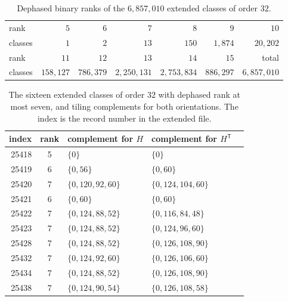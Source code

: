 \documentclass[11pt]{amsart}
\theoremstyle{definition}
\theoremstyle{remark}
\numberwithin{equation}{section}
\numberwithin{table}{section}
\newcommand{\T}{\mathsf{T}}
\begin{document}
\begin{table}[ht]
\centering
\caption{Dephased binary ranks of the $6{,}857{,}010$ extended classes of order $32$.}\label{tab:ranks}
\small
\begin{tabular}{lrrrrrr}
\toprule
rank & $5$ & $6$ & $7$ & $8$ & $9$ & $10$\\
classes & $1$ & $2$ & $13$ & $150$ & $1{,}874$ & $20{,}202$\\
\midrule
rank & $11$ & $12$ & $13$ & $14$ & $15$ & total\\
classes & $158{,}127$ & $786{,}379$ & $2{,}250{,}131$ & $2{,}753{,}834$ & $886{,}297$ & $6{,}857{,}010$\\
\bottomrule
\end{tabular}
\end{table}

\begin{table}[ht]
\centering
\caption{The sixteen extended classes of order $32$ with dephased rank at most seven, and tiling complements for both orientations. The index is the record number in the extended file.}\label{tab:witnesses}
\small
\begin{tabular}{rclll}
\toprule
index & rank & complement for $H$ & complement for $H^{\T}$\\
\midrule
25418 & 5 & $\{0\}$ & $\{0\}$ \\
25419 & 6 & $\{0,\allowbreak 56\}$ & $\{0,\allowbreak 60\}$ \\
25420 & 7 & $\{0,\allowbreak 120,\allowbreak 92,\allowbreak 60\}$ & $\{0,\allowbreak 124,\allowbreak 104,\allowbreak 60\}$ \\
25421 & 6 & $\{0,\allowbreak 60\}$ & $\{0,\allowbreak 60\}$ \\
25422 & 7 & $\{0,\allowbreak 124,\allowbreak 88,\allowbreak 52\}$ & $\{0,\allowbreak 116,\allowbreak 84,\allowbreak 48\}$ \\
25423 & 7 & $\{0,\allowbreak 124,\allowbreak 88,\allowbreak 52\}$ & $\{0,\allowbreak 124,\allowbreak 96,\allowbreak 60\}$ \\
25428 & 7 & $\{0,\allowbreak 124,\allowbreak 88,\allowbreak 52\}$ & $\{0,\allowbreak 126,\allowbreak 108,\allowbreak 90\}$ \\
25432 & 7 & $\{0,\allowbreak 124,\allowbreak 92,\allowbreak 60\}$ & $\{0,\allowbreak 126,\allowbreak 106,\allowbreak 60\}$ \\
25434 & 7 & $\{0,\allowbreak 124,\allowbreak 88,\allowbreak 52\}$ & $\{0,\allowbreak 126,\allowbreak 108,\allowbreak 90\}$ \\
25438 & 7 & $\{0,\allowbreak 124,\allowbreak 90,\allowbreak 54\}$ & $\{0,\allowbreak 126,\allowbreak 108,\allowbreak 58\}$ \\

\end{tabular}
\end{table}
\end{document}
